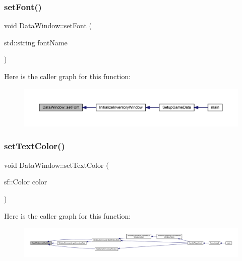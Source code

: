 \subsubsection{\texorpdfstring{set\+Font()}{setFont()}}
{\footnotesize\ttfamily void Data\+Window\+::set\+Font (\begin{DoxyParamCaption}\item[{std\+::string}]{font\+Name }\end{DoxyParamCaption})}

Here is the caller graph for this function\+:
\nopagebreak
\begin{figure}[H]
\begin{center}
\leavevmode
\includegraphics[width=350pt]{d1/def/class_data_window_a66d08b9e2df3b4960fe4e030aabf61be_icgraph}
\end{center}
\end{figure}
\mbox{\label{class_data_window_a05ac7ad6357b9cabd0436c181c6cf29d}} 
\subsubsection{\texorpdfstring{set\+Text\+Color()}{setTextColor()}}
{\footnotesize\ttfamily void Data\+Window\+::set\+Text\+Color (\begin{DoxyParamCaption}\item[{sf\+::\+Color}]{color }\end{DoxyParamCaption})}

Here is the caller graph for this function\+:
\nopagebreak
\begin{figure}[H]
\begin{center}
\leavevmode
\includegraphics[width=350pt]{d1/def/class_data_window_a05ac7ad6357b9cabd0436c181c6cf29d_icgraph}
\end{center}
\end{figure}
\mbox{\label{class_data_window_aa9fe53356b3989e0781a13a03814aaac}} 
